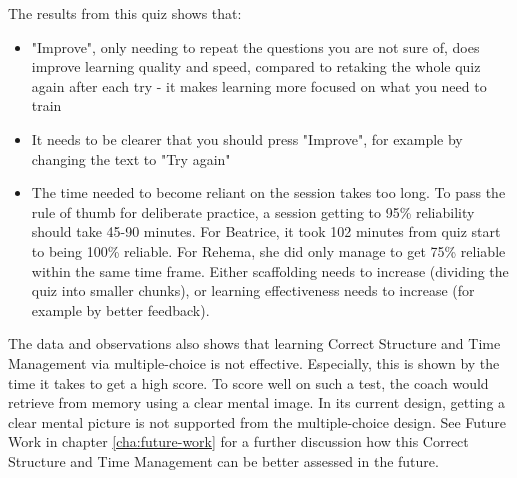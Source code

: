   The results from this quiz shows that:
  \begin{itemize}
  \item "Improve", only needing to repeat the questions you are not sure of, does improve learning quality and speed, compared to retaking the whole quiz again after each try - it makes learning more focused on what you need to train
  \item It needs to be clearer that you should press "Improve", for example by changing the text to "Try again"
  \item The time needed to become reliant on the session takes too long. To pass the rule of thumb for deliberate practice, a session getting to 95\% reliability should take 45-90 minutes. For Beatrice, it took 102 minutes from quiz start to being 100\% reliable. For Rehema, she did only manage to get 75\% reliable within the same time frame. Either scaffolding needs to increase (dividing the quiz into smaller chunks), or learning effectiveness needs to increase (for example by better feedback).
  \end{itemize}

The data and observations also shows that learning Correct Structure and Time Management via multiple-choice is not effective. Especially, this is shown by the time it takes to get a high score. To score well on such a test, the coach would retrieve from memory using a clear mental image. In its current design, getting a clear mental picture is not supported from the multiple-choice design. See Future Work in chapter \ref{cha:future-work} for a further discussion how this Correct Structure and Time Management can be better assessed in the future.
